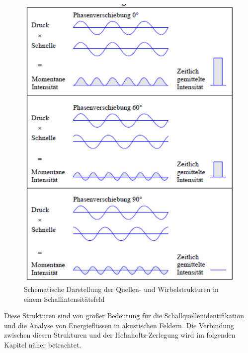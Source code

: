 \begin{figure}[h!]
\centering
\includegraphics[scale=0.4]{papers/helmholtz/images/Schallintensitaet.png}
\caption{Schematische Darstellung der Quellen- und Wirbelstrukturen in einem Schallintensitätsfeld}
\label{fig:Schallintensitaet}
\end{figure}

Diese Strukturen sind von großer Bedeutung für die Schallquellenidentifikation und die Analyse von Energieflüssen in akustischen Feldern. Die Verbindung zwischen diesen Strukturen und der Helmholtz-Zerlegung wird im folgenden Kapitel näher betrachtet.




